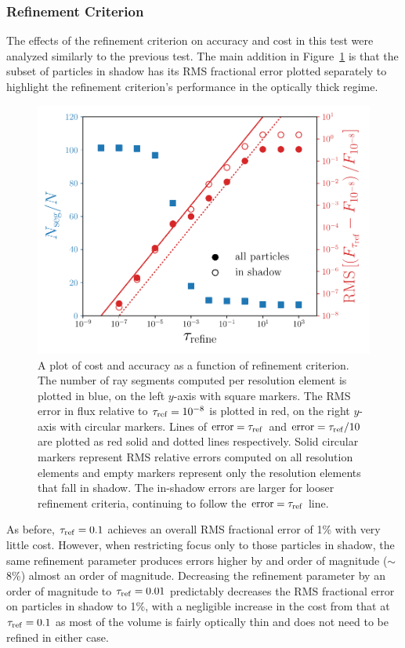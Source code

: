 \documentclass[fleq,usenatbib]{mnras}
\newcommand{\tr}{\tau_{\rm ref}}
\begin{document}
{\subsubsection{Refinement Criterion}
The effects of the refinement criterion on accuracy and cost in this test were 
analyzed similarly to the previous test. The main addition in 
Figure~\ref{fig:isosph} is that the subset of particles in shadow has its RMS 
fractional error plotted separately to highlight the refinement criterion's 
performance in the optically thick regime.
\begin{figure}
\includegraphics[width=1\linewidth]{Figures/isothermal_spheres.pdf}
\caption{A plot of cost and accuracy as a function of refinement criterion. 
The number of ray segments computed per resolution element is plotted in blue, 
on the left $y$-axis with square markers. The RMS error in flux relative to 
$\tr=10^{-8}$ is plotted in red, on the right $y$-axis with circular markers. 
Lines of ${\rm error} = \tr$ and ${\rm error} = \tr/10$ are plotted as red 
solid and dotted lines respectively. Solid circular markers represent RMS 
relative errors computed on all resolution elements and empty markers 
represent only the resolution elements that fall in shadow. The in-shadow 
errors are larger for looser refinement criteria, continuing to follow the 
${\rm error} = \tr$ line.} 
\label{fig:isosph}
\end{figure}
As before, $\tr=0.1$ achieves an overall RMS fractional error of 1\% with very 
little cost. However, when restricting focus only to those particles in 
shadow, the same refinement parameter produces errors higher by and order of 
magnitude ($\sim$8\%) almost an order of magnitude. Decreasing the refinement 
parameter by an order of magnitude to $\tr=0.01$ predictably decreases the RMS 
fractional error on particles in shadow to 1\%, with a negligible 
increase in the cost from that at $\tr=0.1$ as most of the volume is fairly 
optically thin and does not need to be refined in either case.

}
\end{document}
